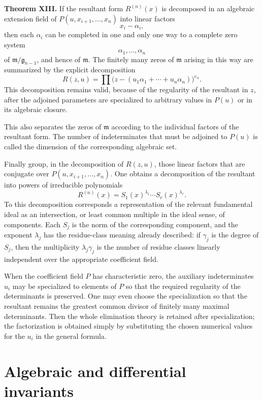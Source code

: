 \documentclass[11pt]{article}
\begin{document}
\textbf{Theorem XIII.} If the resultant form $R^{(n)}(x)$ is decomposed in an algebraic extension field of $P(u,x_{i+1},\ldots,x_n)$ into linear factors
\[
  x_i-\alpha_i,
\]
then each $\alpha_i$ can be completed in one and only one way to a complete zero system
\[
  \alpha_1,
\ldots,\alpha_n
\]
of $\mathfrak m/\mathfrak g_{n-1}$, and hence of $\mathfrak m$. The finitely many zeros of $\mathfrak m$ arising in this way are summarized by the explicit decomposition
\begin{equation}
  R(z,u)=\prod\bigl(z-(u_1\alpha_1+
\cdots+u_n\alpha_n)\bigr)^{e_\alpha}.           \tag{37}
\end{equation}
This decomposition remains valid, because of the regularity of the resultant in $z$, after the adjoined parameters are specialized to arbitrary values in $P(u)$ or in its algebraic closure.

This also separates the zeros of $\mathfrak m$ according to the individual factors of the resultant form. The number of indeterminates that must be adjoined to $P(u)$ is called the dimension of the corresponding algebraic set.

Finally group, in the decomposition of $R(z,u)$, those linear factors that are conjugate over $P(u,x_{i+1},\ldots,x_n)$. One obtains a decomposition of the resultant into powers of irreducible polynomials
\[
  R^{(n)}(x)=S_1(x)^{\lambda_1}\cdots S_r(x)^{\lambda_r}.
\]
To this decomposition corresponds a representation of the relevant fundamental ideal as an intersection, or least common multiple in the ideal sense, of components. Each $S_j$ is the norm of the corresponding component, and the exponent $\lambda_j$ has the residue-class meaning already described: if $\gamma_j$ is the degree of $S_j$, then the multiplicity $\lambda_j\gamma_j$ is the number of residue classes linearly independent over the appropriate coefficient field.

When the coefficient field $P$ has characteristic zero, the auxiliary indeterminates $u_i$ may be specialized to elements of $P$ so that the required regularity of the determinants is preserved. One may even choose the specialization so that the resultant remains the greatest common divisor of finitely many maximal determinants. Then the whole elimination theory is retained after specialization; the factorization is obtained simply by substituting the chosen numerical values for the $u_i$ in the general formula.

\section{Algebraic and differential invariants}
\end{document}
